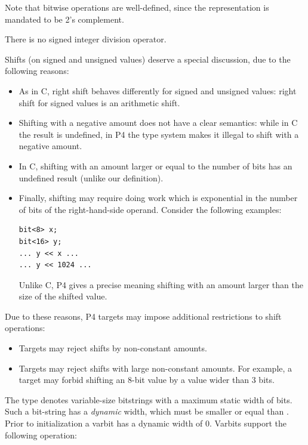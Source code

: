 \documentclass[12pt]{article}
\begin{document}
Note that bitwise operations are well-defined, since the
representation is mandated to be 2's complement.

There is no signed integer division operator.


Shifts (on signed and unsigned values) deserve a special discussion,
due to the following reasons:

\begin{itemize}
  \item As in C, right shift behaves differently for signed and
    unsigned values: right shift for signed values is an arithmetic
    shift.
  \item Shifting with a negative amount does not have a clear
    semantics: while in C the result is undefined, in P4 the type
    system makes it illegal to shift with a negative amount.
  \item In C, shifting with an amount larger or equal to the number of
    bits has an undefined result (unlike our definition).
  \item Finally, shifting may require doing work which is exponential
    in the number of bits of the right-hand-side operand.  Consider
    the following examples:

\begin{lstlisting}[style=P4style]
bit<8> x;
bit<16> y;
... y << x ...
... y << 1024 ...
\end{lstlisting}
    
    Unlike C, P4 gives a precise meaning shifting with an amount
    larger than the size of the shifted value.
\end{itemize}

Due to these reasons, P4 targets may impose additional restrictions to
shift operations:

\begin{itemize}
\item Targets may reject shifts by non-constant amounts.
\item Targets may reject shifts with large non-constant amounts.  For
  example, a target may forbid shifting an 8-bit value by a value
  wider than 3 bits.
\end{itemize}


The type  denotes variable-size bitstrings
with a maximum static width of \W{} bits.  Such a bit-string has a
\emph{dynamic} width, which must be smaller or equal than \W.  Prior
to initialization a varbit has a dynamic width of 0.  Varbits support
the following operation:
\end{document}
